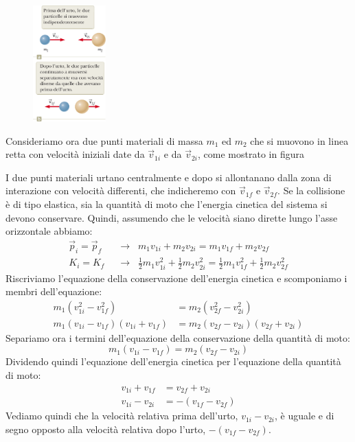\documentclass[a4paper,11pt,oneside]{book}
\begin{document}
\begin{figure}
    \centering
    \includegraphics[width=0.25\textwidth]{urto_elastico.png}
\end{figure}
Consideriamo ora due punti materiali di massa $m_1$ ed $m_2$ che si muovono in linea retta con velocità iniziali date da $\vec{v}_{1i}$ e da $\vec{v}_{2i}$, come mostrato in figura

I due punti materiali urtano centralmente e dopo si allontanano dalla zona di interazione con velocità differenti, che indicheremo con $\vec{v}_{1f}$ e $\vec{v}_{2f}$.
Se la collisione è di tipo elastica, sia la quantità di moto che l'energia cinetica del sistema si devono conservare.
Quindi, assumendo che le velocità siano dirette lungo l’asse orizzontale abbiamo:
\begin{align*}
    \vec{p}_i = \vec{p}_f \;\; &\rightarrow \;\; m_1v_{1i} +  m_2v_{2i} = m_1v_{1f} +  m_2v_{2f} \\
    K_i = K_f \;\; &\rightarrow \;\;\tfrac{1}{2} m_1v_{1i}^2 + \tfrac{1}{2} m_2v_{2i}^2 = \tfrac{1}{2} m_1v_{1f}^2 + \tfrac{1}{2} m_2v_{2f}^2
\end{align*}
Riscriviamo l'equazione della conservazione dell'energia cinetica e scomponiamo i membri dell'equazione:
\begin{align*}
    m_1(v_{1i}^2 - v_{1f}^2) &= m_2(v_{2f}^2 - v_{2i}^2) \\
    m_1(v_{1i} - v_{1f})(v_{1i} + v_{1f}) &= m_2(v_{2f} - v_{2i})(v_{2f} + v_{2i})
\end{align*}
Separiamo ora i termini dell'equazione della conservazione della quantità di moto:
\begin{equation*}
    m_1(v_{1i} - v_{1f}) = m_2(v_{2f} - v_{2i})
\end{equation*}
Dividendo quindi l'equazione dell'energia cinetica per l'equazione della quantità di moto:
\begin{align*}
    v_{1i} + v_{1f} &= v_{2f} + v_{2i} \\ 
    v_{1i} - v_{2i} &= -(v_{1f} - v_{2f})
\end{align*}
Vediamo quindi che la velocità relativa prima dell'urto, $v_{1i} - v_{2i}$, è uguale e di segno opposto alla velocità relativa dopo l'urto, $-(v_{1f} - v_{2f})$.
\end{document}
